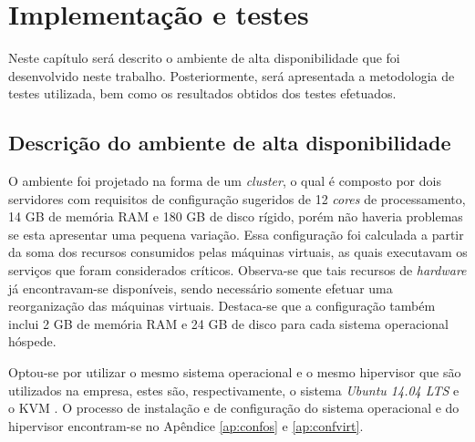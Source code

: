 \chapter{Implementação e testes}
\label{cap:implementacaoresultados}

Neste capítulo será descrito o ambiente de alta disponibilidade que foi desenvolvido neste trabalho. Posteriormente, será apresentada a 
metodologia de testes utilizada, bem como os resultados obtidos dos testes efetuados.

\section{Descrição do ambiente de alta disponibilidade}
\label{section:implementacao}


O ambiente foi projetado na forma de um \textit{cluster}, o qual é composto por dois servidores com requisitos de configuração sugeridos
de 12 \textit{cores} de processamento, 14 GB de memória \ac{RAM} e 180 GB de disco rígido, porém não haveria problemas se esta apresentar 
uma pequena variação.
Essa configuração foi calculada a partir da soma dos recursos consumidos pelas máquinas virtuais, as quais executavam os serviços que foram 
considerados críticos. Observa-se que tais recursos de \textit{hardware} já encontravam-se disponíveis, sendo necessário somente efetuar uma 
reorganização das máquinas virtuais. Destaca-se que a configuração também inclui 2 GB de memória \ac{RAM} e 24 GB de disco para cada sistema 
operacional hóspede.

Optou-se por utilizar o mesmo sistema operacional e o mesmo hipervisor que são utilizados na empresa, estes são, respectivamente, o sistema 
\textit{Ubuntu 14.04 \ac{LTS}} e o \ac{KVM} \cite{kvm}. O processo de instalação e de configuração do sistema operacional e do hipervisor 
encontram-se no Apêndice \ref{ap:confos} e \ref{ap:confvirt}.

